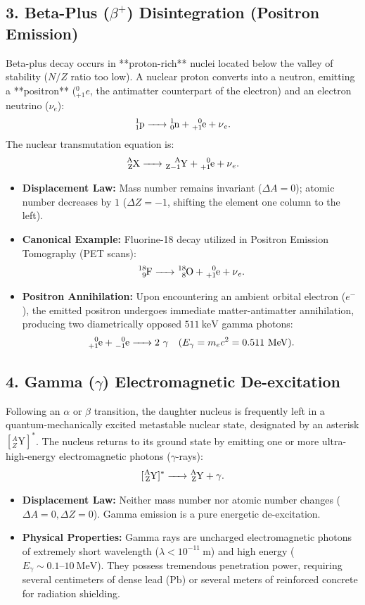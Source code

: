 \subsection{3. Beta-Plus ($\beta^+$) Disintegration (Positron Emission)}
Beta-plus decay occurs in **proton-rich** nuclei located below the valley of stability ($N/Z$ ratio too low). A nuclear proton converts into a neutron, emitting a **positron** ($^0_{+1}e$, the antimatter counterpart of the electron) and an electron neutrino ($\nu_e$):
\begin{equation}
\ce{^1_1p -> ^1_0n + ^0_{+1}e + \nu_e}.
\end{equation}
The nuclear transmutation equation is:
\begin{equation}
\ce{^{A}_{Z}X -> ^{A}_{Z-1}Y + ^0_{+1}e + \nu_e}.
\end{equation}
\begin{itemize}[leftmargin=1.5em,itemsep=2pt]
  \item \textbf{Displacement Law:} Mass number remains invariant ($\Delta A = 0$); atomic number decreases by $1$ ($\Delta Z = -1$, shifting the element one column to the left).
  \item \textbf{Canonical Example:} Fluorine-18 decay utilized in Positron Emission Tomography (PET scans):
  \[
  \ce{^{18}_9F -> ^{18}_8O + ^0_{+1}e + \nu_e}.
  \]
  \item \textbf{Positron Annihilation:} Upon encountering an ambient orbital electron ($e^-$), the emitted positron undergoes immediate matter-antimatter annihilation, producing two diametrically opposed $511\ \mathrm{keV}$ gamma photons:
  \[
  \ce{^0_{+1}e + ^0_{-1}e -> 2\,\gamma} \quad (E_\gamma = m_e c^2 = 0.511\ \mathrm{MeV}).
  \]
\end{itemize}

\subsection{4. Gamma ($\gamma$) Electromagnetic De-excitation}
Following an $\alpha$ or $\beta$ transition, the daughter nucleus is frequently left in a quantum-mechanically excited metastable nuclear state, designated by an asterisk $[^{A}_{Z}\mathrm{Y}]^*$. The nucleus returns to its ground state by emitting one or more ultra-high-energy electromagnetic photons ($\gamma$-rays):
\begin{equation}
\ce{[^{A}_{Z}Y]^* -> ^{A}_{Z}Y + \gamma}.
\end{equation}
\begin{itemize}[leftmargin=1.5em,itemsep=2pt]
  \item \textbf{Displacement Law:} Neither mass number nor atomic number changes ($\Delta A = 0, \Delta Z = 0$). Gamma emission is a pure energetic de-excitation.
  \item \textbf{Physical Properties:} Gamma rays are uncharged electromagnetic photons of extremely short wavelength ($\lambda < 10^{-11}\ \mathrm{m}$) and high energy ($E_\gamma \sim 0.1\text{--}10\ \mathrm{MeV}$). They possess tremendous penetration power, requiring several centimeters of dense lead ($\mathrm{Pb}$) or several meters of reinforced concrete for radiation shielding.
\end{itemize}


